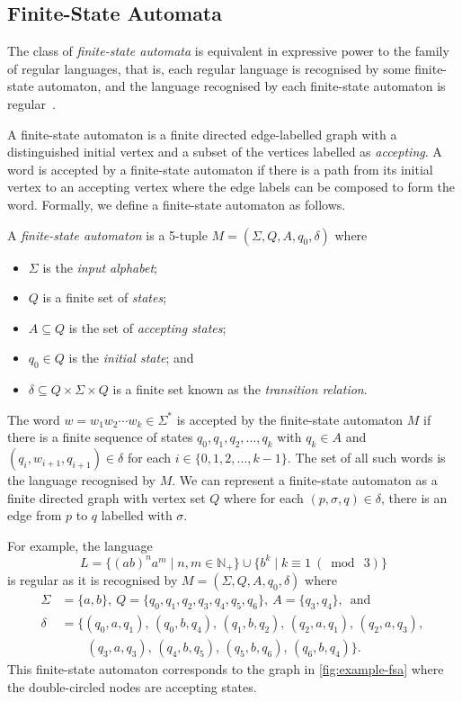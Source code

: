 \subsection{Finite-State Automata}\label{sec:grammars-and-automata/automata}

The class of \emph{finite-state automata} is equivalent in expressive power to the family of regular languages, that is, each regular language is recognised by some finite-state automaton, and the language recognised by each finite-state automaton is regular~\cite[Theorm~1.54]{sipser2013}.

A finite-state automaton is a finite directed edge-labelled graph with a distinguished initial vertex and a subset of the vertices labelled as \emph{accepting}.
A word is accepted by a finite-state automaton if there is a path from its initial vertex to an accepting vertex where the edge labels can be composed to form the word.
Formally, we define a finite-state automaton as follows.

\begin{definition}\label{defn:fsa-definition}
	A \emph{finite-state automaton} is a 5-tuple $M = (\Sigma, Q, A, q_0, \delta)$ where
	\begin{itemize}
		\item $\Sigma$ is the \emph{input alphabet};
		\item $Q$ is a finite set of \emph{states};
		\item $A \subseteq Q$ is the set of \emph{accepting states};
		\item $q_0 \in Q$ is the \emph{initial state}; and
		\item $\delta \subseteq Q \times \Sigma \times Q$ is a finite set known as the \emph{transition relation}. 
	\end{itemize}
	The word $w = w_1 w_2 \cdots w_k \in \Sigma^*$ is accepted by the finite-state automaton $M$ if there is a finite sequence of states $q_0, q_1, q_2, \ldots, q_k$ with $q_k \in A$ and $(q_i,w_{i+1},q_{i+1}) \in \delta$ for each $i \in \{0,1,2,\ldots,k-1\}$.
	The set of all such words is the language recognised by $M$.
	We can represent a finite-state automaton as a finite directed graph with vertex set $Q$ where for each $(p,\sigma,q) \in \delta$, there is an edge from $p$ to $q$ labelled with $\sigma$.
\end{definition}

For example, the language
\[
	L
	=
	\{
		(ab)^n a^m
	\mid
		n,m \in \mathbb{N}_+
	\}
	\cup
	\{
		b^k
	\mid
		k \equiv 1\ (\bmod\ 3)
	\}
\]
is regular as it is recognised by $M = (\Sigma,Q,A,q_0,\delta)$ where
\begin{align*}
	\Sigma &= \{a,b\},\ 
	Q = \{q_0,q_1,q_2,q_3,q_4,q_5,q_6\},\
	A = \{q_3,q_4\},\, 
	\text{ and }\\
	\delta &= \{
		(q_0,a,q_1),\,
		(q_0,b,q_4),\,
		(q_1,b,q_2),\,
		(q_2,a,q_1),\,
		(q_2,a,q_3),\,\\&\phantom{= \{\ }
		(q_3,a,q_3),\,
		(q_4,b,q_5),\,
		(q_5,b,q_6),\,
		(q_6,b,q_4)
	\}.
\end{align*}
This finite-state automaton corresponds to the graph in \cref{fig:example-fsa} where the double-circled nodes are accepting states.

